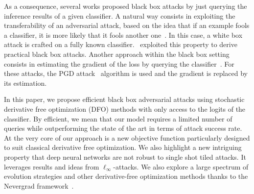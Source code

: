As a consequence, several works proposed black box attacks by just querying the inference results of a given classifier. A natural way consists in exploiting the transferability of an adversarial attack, based on the idea that if an example fools a classifier, it is more likely that it fools another one~\citep{papernot2016transferability}. In this case, a white box attack is crafted on a fully known classifier.~\cite{Papernot2017PBA} exploited this property to derive practical black box attacks. Another approach within the black box setting consists in estimating the gradient of the loss by querying the classifier~\citep{chen2017zoo,ilyas2018black,ilyas2018prior}. For these attacks, the PGD attack~\citep{kurakin2016adversarial,madry2018towards} algorithm is used and the gradient is replaced by its estimation. %

In this paper, we propose efficient black box adversarial attacks using stochastic derivative free optimization (DFO) methods with only access to the logits of the classifier. By efficient, we mean that our model requires a limited number of queries while outperforming the state of the art in terms of attack success rate. At the very core of our approach is a new objective function particularly designed to suit classical derivative free optimization.   We also highlight a new intriguing property that deep neural networks are not robust to single shot tiled attacks.  It leverages results and ideas from $\ell_\infty$-attacks. We also explore a large spectrum of evolution strategies and other derivative-free optimization methods thanks to the Nevergrad framework~\citep{nevergrad}. 


